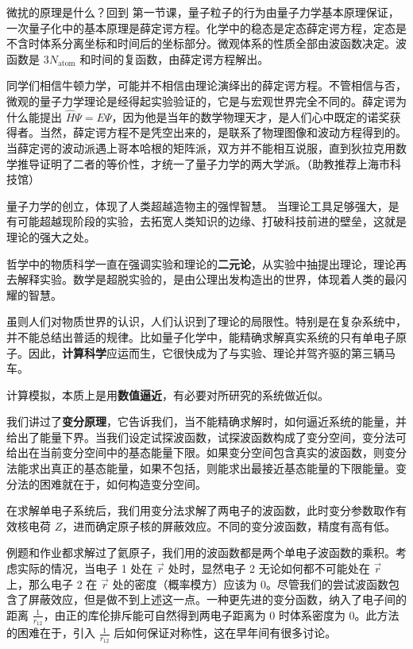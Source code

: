 微扰的原理是什么？回到
第一节课，量子粒子的行为由量子力学基本原理保证，一次量子化中的基本原理是薛定谔方程。化学中的稳态是定态薛定谔方程，定态是不含时体系分离坐标和时间后的坐标部分。微观体系的性质全部由波函数决定。波函数是 $3N_{\text{atom}}$ 和时间的复函数，由薛定谔方程解出。

同学们相信牛顿力学，可能并不相信由理论演绎出的薛定谔方程。不管相信与否，微观的量子力学理论是经得起实验验证的，它是与宏观世界完全不同的。薛定谔为什么能提出 $\hat H \Psi = E \Psi$，因为他是当年的数学物理天才，是人们心中既定的诺奖获得者。当然，薛定谔方程不是凭空出来的，是联系了物理图像和波动方程得到的。当薛定谔的波动派遇上哥本哈根的矩阵派，双方并不能相互说服，直到狄拉克用数学推导证明了二者的等价性，才统一了量子力学的两大学派。（助教推荐上海市科技馆）

量子力学的创立，体现了人类超越造物主的强悍智慧。
当理论工具足够强大，是有可能超越现阶段的实验，去拓宽人类知识的边缘、打破科技前进的壁垒，这就是理论的强大之处。

哲学中的物质科学一直在强调实验和理论的\textbf{二元论}，从实验中抽提出理论，理论再去解释实验。数学是超脱实验的，是由公理出发构造出的世界，体现着人类的最闪耀的智慧。

虽则人们对物质世界的认识，人们认识到了理论的局限性。特别是在复杂系统中，并不能总结出普适的规律。比如量子化学中，能精确求解真实系统的只有单电子原子。因此，\textbf{计算科学}应运而生，它很快成为了与实验、理论并驾齐驱的第三辆马车。




计算模拟，本质上是用\textbf{数值逼近}，有必要对所研究的系统做近似。

我们讲过了\textbf{变分原理}，它告诉我们，当不能精确求解时，如何逼近系统的能量，并给出了能量下界。当我们设定试探波函数，试探波函数构成了变分空间，变分法可给出在当前变分空间中的基态能量下限。如果变分空间包含真实的波函数，则变分法能求出真正的基态能量，如果不包括，则能求出最接近基态能量的下限能量。变分法的困难就在于，如何构造变分空间。

在求解单电子系统后，我们用变分法求解了两电子的波函数，此时变分参数取作有效核电荷 $Z$，进而确定原子核的屏蔽效应。不同的变分波函数，精度有高有低。

例题和作业都求解过了氦原子，我们用的波函数都是两个单电子波函数的乘积。考虑实际的情况，当电子 1 处在 $\vec r$ 处时，显然电子 2 无论如何都不可能处在 $\vec r$ 上，那么电子 2 在 $\vec r$ 处的密度（概率模方）应该为 0。尽管我们的尝试波函数包含了屏蔽效应，但是做不到上述这一点。一种更先进的变分函数，纳入了电子间的距离 $\frac1{r_{12}}$，由正的库伦排斥能可自然得到两电子距离为 0 时体系密度为 0。此方法的困难在于，引入 $\frac1{r_{12}}$ 后如何保证对称性，这在早年间有很多讨论。


